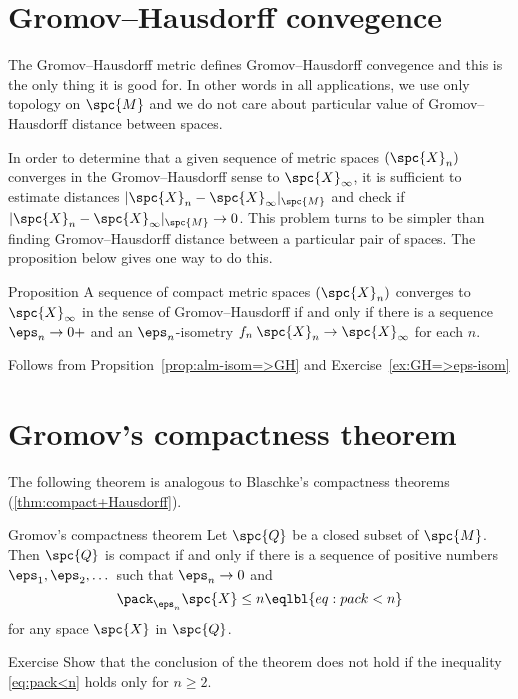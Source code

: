 \section{Gromov--Hausdorff convegence}

The Gromov--Hausdorff metric defines Gromov--Hausdorff convegence
and this is the only thing it is good for.
In other words in all applications, we use only topology on $\spc{M}$
and we do not care about particular value of Gromov--Hausdorff distance between spaces.

In order to determine that a given sequence of metric spaces $(\spc{X}_n)$ converges in the Gromov--Hausdorff sense to $\spc{X}_\infty$, it is sufficient to estimate distances $|\spc{X}_n-\spc{X}_\infty|_{\spc{M}}$ and  check if $|\spc{X}_n-\spc{X}_\infty|_{\spc{M}}\to 0$.
This problem turns to be simpler than finding Gromov--Hausdorff distance between a particular pair of spaces.
The proposition below gives one way to do this.

\begin{thm}{Proposition}\label{prop:GH-e-isom}
A sequence of compact metric spaces $(\spc{X}_n)$ converges to  $\spc{X}_\infty$ in the sense of Gromov--Hausdorff if and only if there is a sequence $\eps_n\to0+$
and an $\eps_n$-isometry $f_n\:\spc{X}_n\to \spc{X}_\infty$ for each $n$.
\end{thm}

 Follows from Propsition~\ref{prop:alm-isom=>GH} and Exercise~\ref{ex:GH=>eps-isom}
\qeds


\section{Gromov's compactness theorem}

The following theorem is analogous to Blaschke's compactness theorems (\ref{thm:compact+Hausdorff}).

\begin{thm}{Gromov's compactness theorem}\label{thm:gromov-compactness}%
Let $\spc{Q}$ be a closed subset of $\spc{M}$.
Then $\spc{Q}$ is compact if and only if there is a sequence of positive numbers $\eps_1,\eps_2,\dots$ such that $\eps_n\to 0$ and 
$$\pack_{\eps_n}\spc{X}\le n\eqlbl{eq:pack<n}$$
for any space $\spc{X}$ in $\spc{Q}$.
\end{thm}

\begin{thm}{Exercise}\label{pack<n;n>1}
Show that the conclusion of the theorem does not hold
if the inequality \ref{eq:pack<n} holds only for $n\ge 2$.
\end{thm}




